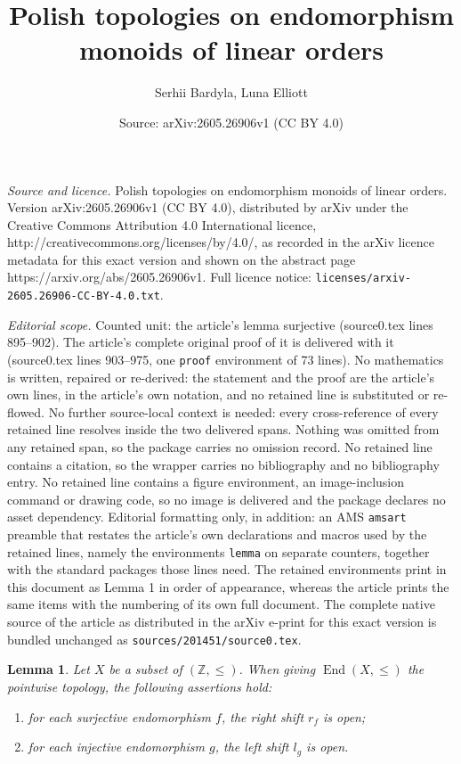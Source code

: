 \documentclass[10pt,a4paper]{amsart}
\title{Polish topologies on endomorphism monoids of linear orders}
\author{Serhii Bardyla, Luna Elliott}
\date{Source: arXiv:2605.26906v1 (CC BY 4.0)}
\newtheorem{lemma}{Lemma}
\newcommand{\Xendd}{\operatorname{End}(X, \leq)}
\newcommand{\Z}{\mathbb Z}
\begin{document}
\maketitle

\noindent\emph{Source and licence.} Polish topologies on endomorphism monoids of linear orders. Version arXiv:2605.26906v1 (CC BY 4.0), distributed by arXiv under the Creative Commons Attribution 4.0 International licence, http://creativecommons.org/licenses/by/4.0/, as recorded in the arXiv licence metadata for this exact version and shown on the abstract page https://arxiv.org/abs/2605.26906v1. Full licence notice: \texttt{licenses/arxiv-2605.26906-CC-BY-4.0.txt}.\par\smallskip

\noindent\textit{Editorial scope.} Counted unit: the article's lemma surjective (source0.tex lines 895--902). The article's complete original proof of it is delivered with it (source0.tex lines 903--975, one \texttt{proof} environment of 73 lines). No mathematics is written, repaired or re-derived: the statement and the proof are the article's own lines, in the article's own notation, and no retained line is substituted or re-flowed.  No further source-local context is needed: every cross-reference of every retained line resolves inside the two delivered spans.  Nothing was omitted from any retained span, so the package carries no omission record.  No retained line contains a citation, so the wrapper carries no bibliography and no bibliography entry.  No retained line contains a figure environment, an image-inclusion command or drawing code, so no image is delivered and the package declares no asset dependency.  Editorial formatting only, in addition: an AMS \texttt{amsart} preamble that restates the article's own declarations and macros used by the retained lines, namely the environments \texttt{lemma} on separate counters, together with the standard packages those lines need.  The retained environments print in this document as Lemma 1 in order of appearance, whereas the article prints the same items with the numbering of its own full document.  The complete native source of the article as distributed in the arXiv e-print for this exact version is bundled unchanged as \texttt{sources/201451/source0.tex}.
\begin{lemma}\label{strong surjective}
Let \(X\) be a  subset of \((\Z,\leq)\).
When giving \(\Xendd\) the pointwise topology, the following assertions hold: 
\begin{enumerate}
    \item for each surjective endomorphism $f$, the right shift $r_f$ is open;
    \item for each injective endomorphism $g$, the left shift $l_g$ is open.
\end{enumerate}
\end{lemma}
\end{document}
